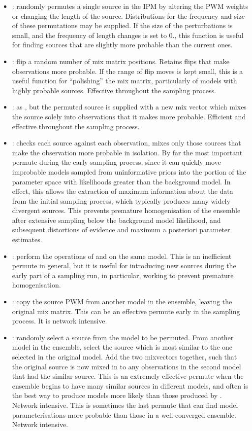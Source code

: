 \begin{itemize}
    \item {}: randomly permutes a single source in the IPM by altering the PWM weights or changing the length of the source. Distributions for the frequency and size of these permutations may be supplied. If the size of the perturbations is small, and the frequency of length changes is set to 0., this function is useful for finding sources that are slightly more probable than the current ones.
    \item {}: flip a random number of mix matrix positions. Retains flips that make observations more probable. If the range of flip moves is kept small, this is a useful function for ``polishing'' the mix matrix, particularly of models with highly probable sources. Effective throughout the sampling process.
    \item {}: as , but the permuted source is supplied with a new mix vector which mixes the source solely into observations that it makes more probable. Efficient and effective throughout the sampling process.
    \item {}: checks each source against each observation, mixes only those sources that make the observation more probable in isolation. By far the most important permute during the early sampling process, since it can quickly move improbable models sampled from uninformative priors into the portion of the parameter space with likelihoods greater than the background model. In effect, this allows the extraction of maximum information about the data from the initial sampling process, which typically produces many widely divergent sources. This prevents premature homogenisation of the ensemble after extensive sampling below the background model likelihood, and subsequent distortions of evidence and maximum a posteriori parameter estimates.
    \item {}: perform the operations of  and  on the same model. This is an inefficient permute in general, but it is useful for introducing new sources during the early part of a sampling run, in particular, working to prevent premature homogenisation.
    \item {}: copy the source PWM from another model in the ensemble, leaving the original mix matrix. This can be an effective permute early in the sampling process. It is network intensive.
    \item {}: randomly select a source from the model to be permuted. From another model in the ensemble, select the source which is most similar to the one selected in the original model. Add the two mixvectors together, such that the original source is now mixed in to any observations in the second model that had the similar source. This is an extremely effective permute when the ensemble begins to have many similar sources in different models, and often is the best way to produce models more likely than those produced by . Network intensive. This is sometimes the last permute that can find model parameterisations more probable than those in a well-converged ensemble. Network intensive.

\end{itemize}
